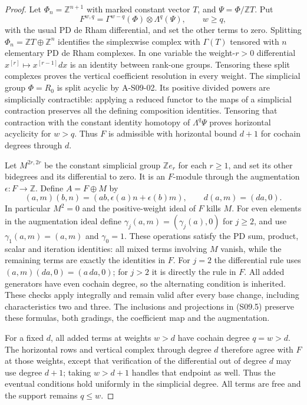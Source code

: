 \begin{proof}
Let $\Phi_n=\mathbb Z^{n+1}$ with marked constant vector $T$, and
$\Psi=\Phi/\mathbb ZT$.  Put
\[
 F^{w,q}=\Gamma^{w-q}(\Phi)\otimes\Lambda^q(\Psi),
 \qquad w\geq q,
\]
with the usual PD de Rham differential, and set the other terms to
zero.  Splitting $\Phi_n=\mathbb ZT\oplus\mathbb Z^n$ identifies
the simplexwise complex with $\Gamma(T)$ tensored with $n$ elementary
PD de Rham complexes.  In one variable the weight-$r>0$ differential
$x^{[r]}\mapsto x^{[r-1]}dx$ is an identity between rank-one groups.
Tensoring these split complexes proves the vertical coefficient
resolution in every weight.
The simplicial group $\Phi=R_0$ is split acyclic by A-S09-02.
Its positive divided powers are simplicially contractible: applying
a reduced functor to the maps of a simplicial contraction preserves
all the defining composition identities.  Tensoring that contraction
with the constant identity homotopy of $\Lambda^q\Psi$ proves
horizontal acyclicity for $w>q$.  Thus $F$ is admissible with
horizontal bound $d+1$ for cochain degrees through $d$.

Let $M^{2r,2r}$ be the constant simplicial group $\mathbb Z e_r$
for each $r\geq1$, and set its other bidegrees and its differential
to zero.  It is an $F$-module through the augmentation
$\epsilon:F\to\mathbb Z$.  Define $A=F\oplus M$ by
\[
 (a,m)(b,n)=(ab,\epsilon(a)n+\epsilon(b)m),\qquad
 d(a,m)=(da,0).
 \tag{S09.7}
\]
In particular $M^2=0$ and the positive-weight ideal of $F$ kills $M$.
For even elements in the augmentation ideal define
$\gamma_j(a,m)=(\gamma_j(a),0)$ for $j\geq2$, and use
$\gamma_1(a,m)=(a,m)$ and $\gamma_0=1$.
These operations satisfy the PD sum, product, scalar and iteration
identities: all mixed terms involving $M$ vanish, while the remaining
terms are exactly the identities in $F$.  For $j=2$ the differential
rule uses $(a,m)(da,0)=(a\,da,0)$; for $j>2$ it is directly the
rule in $F$.  All added generators have even cochain degree, so the
alternating condition is inherited.  These checks apply integrally
and remain valid after every base change, including characteristics
two and three.  The inclusions and projections in (S09.5) preserve
these formulas, both gradings, the coefficient map and the augmentation.

For a fixed $d$, all added terms at weights $w>d$ have cochain degree
$q=w>d$.  The horizontal rows and vertical complex through degree
$d$ therefore agree with $F$ at those weights, except that verification
of the differential out of degree $d$ may use degree $d+1$; taking
$w>d+1$ handles that endpoint as well.  Thus the eventual conditions
hold uniformly in the simplicial degree.  All terms are free and
the support remains $q\leq w$.


\end{proof}
